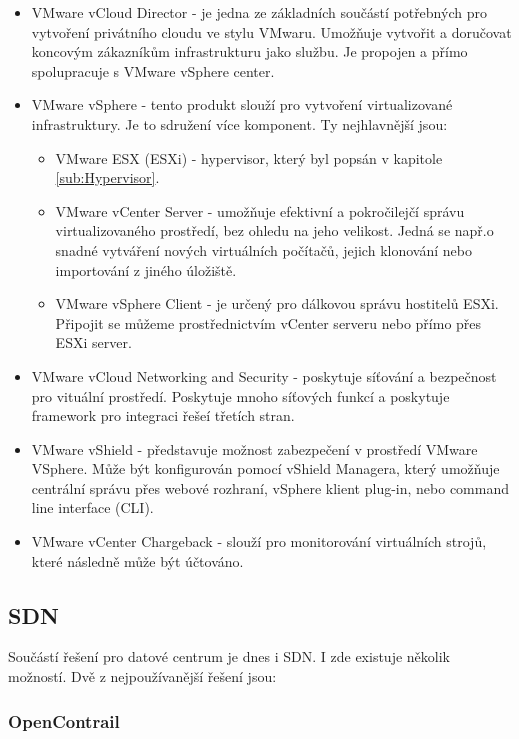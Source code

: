 \begin{itemize}
\item VMware vCloud Director - je  jedna  ze základních součástí potřebných pro vytvoření  privátního  cloudu ve stylu VMwaru.  Umožňuje vytvořit  a  doručovat  koncovým  zákazníkům infrastrukturu jako službu. Je propojen a přímo spolupracuje s VMware vSphere center.
\item VMware vSphere - tento produkt slouží pro vytvoření virtualizované infrastruktury. Je to sdružení více komponent. Ty nejhlavnější jsou:

\begin{itemize}
\item VMware ESX (ESXi) - hypervisor, který byl popsán v kapitole \ref{sub:Hypervisor}.
\item VMware vCenter Server - umožňuje efektivní a pokročilejčí správu virtualizovaného prostředí, bez ohledu na jeho velikost. Jedná se např.o snadné vytváření nových virtuálních počítačů, jejich  klonování  nebo  importování  z jiného  úložiště.  
\item VMware vSphere Client - je určený pro dálkovou správu hostitelů ESXi. Připojit se můžeme prostřednictvím vCenter serveru nebo přímo přes ESXi server.
\end{itemize} 
\item VMware vCloud Networking and Security - poskytuje síťování a bezpečnost pro vituální prostředí. Poskytuje mnoho síťových funkcí a poskytuje framework pro integraci řešeí třetích stran.
\item VMware vShield - představuje možnost zabezpečení v prostředí VMware VSphere. Může být konfigurován pomocí vShield Managera, který umožňuje centrální správu přes webové rozhraní, vSphere klient plug-in, nebo command line interface (CLI).
\item VMware vCenter Chargeback - slouží pro monitorování virtuálních strojů, které následně může být účtováno.
\end{itemize}

\subsection{SDN}

Součástí řešení pro datové centrum je dnes i SDN. I zde existuje několik možností. Dvě z nejpoužívanější řešení jsou:

\subsubsection{OpenContrail} 

